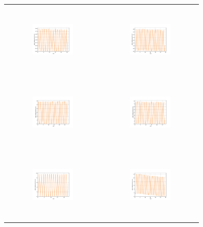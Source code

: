 \begin{figure}[H]
\begin{center}
\begin{tabular}{cc}
\includegraphics[width=0.45\textwidth, height=3.5cm]{graph/omega=1.50_A=1_plate.pdf}
&
\includegraphics[width=0.45\textwidth, height=3.5cm]{graph/omega=1.50_A=2_plate.pdf}\\
\includegraphics[width=0.45\textwidth, height=3.5cm]{graph/omega=1.50_A=3_plate.pdf}
&
\includegraphics[width=0.45\textwidth, height=3.5cm]{graph/omega=1.50_A=4_plate.pdf}\\
\includegraphics[width=0.45\textwidth, height=3.5cm]{graph/omega=1.50_A=5_plate.pdf}
&
\includegraphics[width=0.45\textwidth, height=3.5cm]{graph/omega=1.50_A=6_plate.pdf}\\

\end{tabular}
\end{center}
\end{figure}
